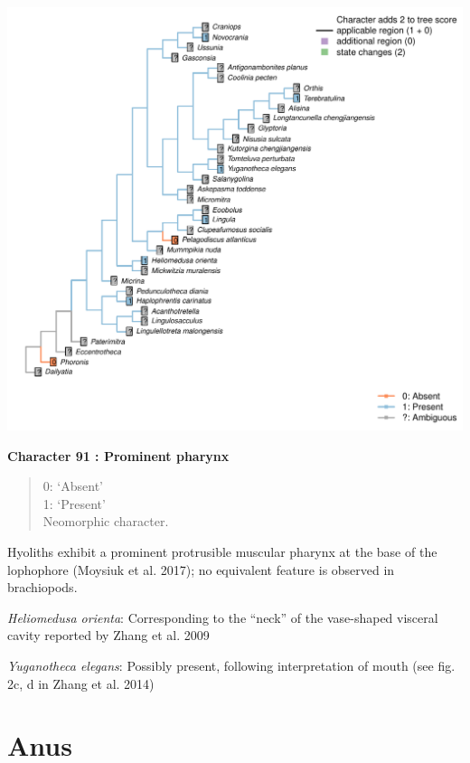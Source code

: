 \documentclass[]{book}
\theoremstyle{definition}
\theoremstyle{definition}
\theoremstyle{definition}
\theoremstyle{remark}
\begin{document}
\includegraphics{Brachiopod_phylogeny_files/figure-latex/unnamed-chunk-5-91.pdf}

\textbf{Character 91 : Prominent pharynx }

\begin{quote}
0: `Absent'\\
1: `Present'\\
Neomorphic character.
\end{quote}

Hyoliths exhibit a prominent protrusible muscular pharynx at the base of
the lophophore (Moysiuk et al. 2017); no equivalent feature is observed
in brachiopods.

\emph{Heliomedusa orienta}: Corresponding to the ``neck'' of the
vase-shaped visceral cavity reported by Zhang et al. 2009

\emph{Yuganotheca elegans}: Possibly present, following interpretation
of mouth (see fig. 2c, d in Zhang et al. 2014)

\hypertarget{anus}{%
\section*{Anus}\label{anus}}
\end{document}
